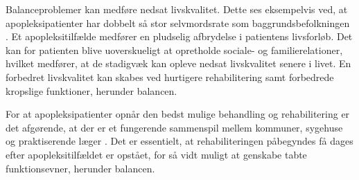 Balanceproblemer kan medføre nedsat livskvalitet. Dette ses eksempelvis ved, at apopleksipatienter har dobbelt så stor selvmordsrate som baggrundsbefolkningen \cite{Sundhedsstyrelsen2010}. Et apopleksitilfælde medfører en pludselig afbrydelse i patientens livsforløb. Det kan for patienten blive uoverskueligt at opretholde sociale- og familierelationer, hvilket medfører, at de stadigvæk kan opleve nedsat livskvalitet senere i livet. En forbedret livskvalitet kan skabes ved hurtigere rehabilitering samt forbedrede kropslige funktioner, herunder balancen. \cite{Sundhedsstyrelsen2010}

For at apopleksipatienter opnår den bedst mulige behandling og rehabilitering er det afgørende, at der er et fungerende sammenspil mellem kommuner, sygehuse og praktiserende læger \cite{Sundhedsstyrelsen2010}. Det er essentielt, at rehabiliteringen påbegyndes få dages efter apopleksitilfældet er opstået, for så vidt muligt at genskabe tabte funktionsevner, herunder balancen. \cite{Kruuse2015} 






